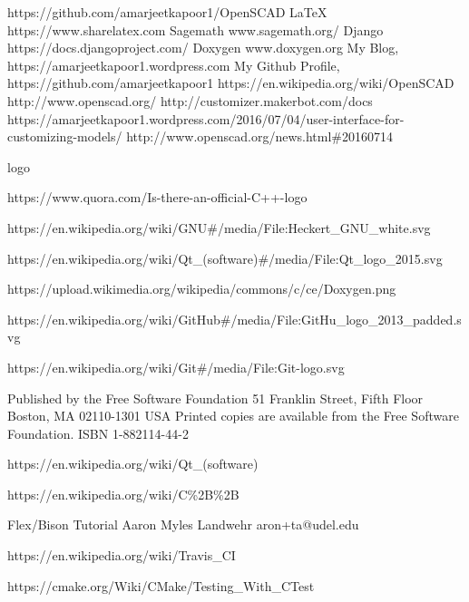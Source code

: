 \begin{thebibliography}{22}
\bibitem{}  https://github.com/amarjeetkapoor1/OpenSCAD
\bibitem{} \LaTeX{} https://www.sharelatex.com
\bibitem{} Sagemath www.sagemath.org/
\bibitem{} Django https://docs.djangoproject.com/
\bibitem{} Doxygen www.doxygen.org
\bibitem{} My Blog, https://amarjeetkapoor1.wordpress.com
\bibitem{} My Github Profile, https://github.com/amarjeetkapoor1
\bibitem{} https://en.wikipedia.org/wiki/OpenSCAD
\bibitem{} http://www.openscad.org/
\bibitem{} http://customizer.makerbot.com/docs
\bibitem{} https://amarjeetkapoor1.wordpress.com/2016/07/04/user-interface-for-customizing-models/
\bibitem{} http://www.openscad.org/news.html\#20160714


logo

\bibitem{} https://www.quora.com/Is-there-an-official-C++-logo

\bibitem{} https://en.wikipedia.org/wiki/GNU\#/media/File:Heckert\_GNU\_white.svg

\bibitem{} https://en.wikipedia.org/wiki/Qt\_(software)\#/media/File:Qt\_logo\_2015.svg


\bibitem{} https://upload.wikimedia.org/wikipedia/commons/c/ce/Doxygen.png

\bibitem{} https://en.wikipedia.org/wiki/GitHub\#/media/File:GitHu\_logo\_2013\_padded.svg

\bibitem{} https://en.wikipedia.org/wiki/Git\#/media/File:Git-logo.svg

\bibitem{}
Published by the Free Software Foundation
51 Franklin Street, Fifth Floor
Boston, MA 02110-1301 USA
Printed copies are available from the Free Software Foundation.
ISBN 1-882114-44-2

\bibitem{} https://en.wikipedia.org/wiki/Qt\_(software)

\bibitem{} https://en.wikipedia.org/wiki/C\%2B\%2B

\bibitem{} Flex/Bison Tutorial
Aaron Myles Landwehr
aron+ta@udel.edu

\bibitem{} https://en.wikipedia.org/wiki/Travis\_CI

\bibitem{} https://cmake.org/Wiki/CMake/Testing\_With\_CTest

\end{thebibliography}

